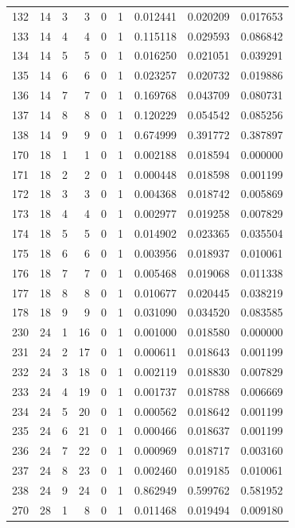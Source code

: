 \begin{longtable}{rrrrrrrrr}
132 & 14 & 3 & 3 & 0 & 1 & 0.012441 & 0.020209 & 0.017653 \\
133 & 14 & 4 & 4 & 0 & 1 & 0.115118 & 0.029593 & 0.086842 \\
134 & 14 & 5 & 5 & 0 & 1 & 0.016250 & 0.021051 & 0.039291 \\
135 & 14 & 6 & 6 & 0 & 1 & 0.023257 & 0.020732 & 0.019886 \\
136 & 14 & 7 & 7 & 0 & 1 & 0.169768 & 0.043709 & 0.080731 \\
137 & 14 & 8 & 8 & 0 & 1 & 0.120229 & 0.054542 & 0.085256 \\
138 & 14 & 9 & 9 & 0 & 1 & 0.674999 & 0.391772 & 0.387897 \\
170 & 18 & 1 & 1 & 0 & 1 & 0.002188 & 0.018594 & 0.000000 \\
171 & 18 & 2 & 2 & 0 & 1 & 0.000448 & 0.018598 & 0.001199 \\
172 & 18 & 3 & 3 & 0 & 1 & 0.004368 & 0.018742 & 0.005869 \\
173 & 18 & 4 & 4 & 0 & 1 & 0.002977 & 0.019258 & 0.007829 \\
174 & 18 & 5 & 5 & 0 & 1 & 0.014902 & 0.023365 & 0.035504 \\
175 & 18 & 6 & 6 & 0 & 1 & 0.003956 & 0.018937 & 0.010061 \\
176 & 18 & 7 & 7 & 0 & 1 & 0.005468 & 0.019068 & 0.011338 \\
177 & 18 & 8 & 8 & 0 & 1 & 0.010677 & 0.020445 & 0.038219 \\
178 & 18 & 9 & 9 & 0 & 1 & 0.031090 & 0.034520 & 0.083585 \\
230 & 24 & 1 & 16 & 0 & 1 & 0.001000 & 0.018580 & 0.000000 \\
231 & 24 & 2 & 17 & 0 & 1 & 0.000611 & 0.018643 & 0.001199 \\
232 & 24 & 3 & 18 & 0 & 1 & 0.002119 & 0.018830 & 0.007829 \\
233 & 24 & 4 & 19 & 0 & 1 & 0.001737 & 0.018788 & 0.006669 \\
234 & 24 & 5 & 20 & 0 & 1 & 0.000562 & 0.018642 & 0.001199 \\
235 & 24 & 6 & 21 & 0 & 1 & 0.000466 & 0.018637 & 0.001199 \\
236 & 24 & 7 & 22 & 0 & 1 & 0.000969 & 0.018717 & 0.003160 \\
237 & 24 & 8 & 23 & 0 & 1 & 0.002460 & 0.019185 & 0.010061 \\
238 & 24 & 9 & 24 & 0 & 1 & 0.862949 & 0.599762 & 0.581952 \\
270 & 28 & 1 & 8 & 0 & 1 & 0.011468 & 0.019494 & 0.009180 \\

\end{longtable}

